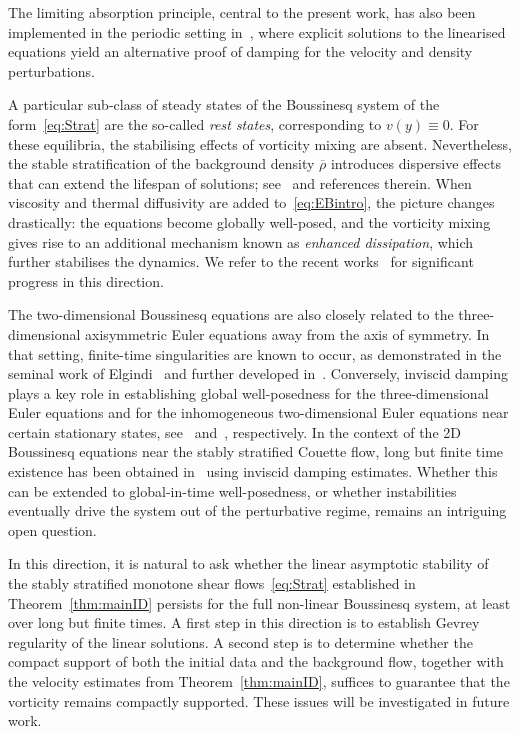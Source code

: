 \documentclass[11pt,reqno]{amsproc}
\theoremstyle{definition}
\numberwithin{equation}{section}
\begin{document}
The limiting absorption principle, central to the present work, has also been implemented in the periodic setting in~\cite{CZN23strip}, where explicit solutions to the linearised equations yield an alternative proof of damping for the velocity and density perturbations.

A particular sub-class of steady states of the Boussinesq system of the form~\eqref{eq:Strat} are the so-called \emph{rest states}, corresponding to $v(y)\equiv0$. For these equilibria, the stabilising effects of vorticity mixing are absent. Nevertheless, the stable stratification of the background density $\overline\rho$ introduces dispersive effects that can extend the lifespan of solutions; see~\cite{elgindi2015sharp, jurja2024long, jurja2025effect} and references therein. When viscosity and thermal diffusivity are added to~\eqref{eq:EBintro}, the picture changes drastically: the equations become globally well-posed, and the vorticity mixing gives rise to an additional mechanism known as \emph{enhanced dissipation}, which further stabilises the dynamics. We refer to the recent works~\cites{arbon2025enhanced, coti2024stability, knobel2025suppression, masmoudi2022stability, masmoudi2023asymptotic, niu2024improved, zhang2023stability, zhai2023stability, zillinger2021enhanced, masmoudi2025linear} for significant progress in this direction.

The two-dimensional Boussinesq equations are also closely related to the three-dimensional axisymmetric Euler equations away from the axis of symmetry. In that setting, finite-time singularities are known to occur, as demonstrated in the seminal work of Elgindi~\cite{Elgindi21} and further developed in~\cites{ElgindiJeong19, ElgindiJeong20, ChenHou23}. Conversely, inviscid damping plays a key role in establishing global well-posedness for the three-dimensional Euler equations and for the inhomogeneous two-dimensional Euler equations near certain stationary states, see~\cite{GPW} and~\cite{CWZZ, Zhao23}, respectively. In the context of the 2D Boussinesq equations near the stably stratified Couette flow, long but finite time existence has been obtained in~\cite{BBCZD21} using inviscid damping estimates. Whether this can be extended to global-in-time well-posedness, or whether instabilities eventually drive the system out of the perturbative regime, remains an intriguing open question.

In this direction, it is natural to ask whether the linear asymptotic stability of the stably stratified monotone shear flows~\eqref{eq:Strat} established in Theorem~\ref{thm:mainID} persists for the full non-linear Boussinesq system, at least over long but finite times. A first step in this direction is to establish Gevrey regularity of the linear solutions. A second step is to determine whether the compact support of both the initial data and the background flow, together with the velocity estimates from Theorem~\ref{thm:mainID}, suffices to guarantee that the vorticity remains compactly supported. These issues will be investigated in future work.
\end{document}
